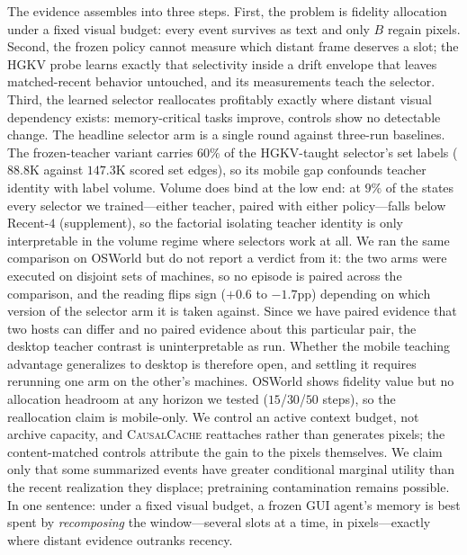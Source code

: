 \documentclass[letterpaper]{article} %
\newcommand{\method}{\textsc{CausalCache}}
\newcommand{\hgkv}{\textsc{HGKV}}
\begin{document}
The evidence assembles into three steps. First, the problem is fidelity
allocation under a fixed visual budget: every event survives as text and
only $B$ regain pixels. Second, the frozen policy cannot measure which
distant frame deserves a slot; the \hgkv{} probe learns exactly that
selectivity inside a drift envelope that leaves matched-recent behavior
untouched, and its measurements teach the selector. Third, the learned
selector reallocates profitably exactly where distant visual dependency
exists: memory-critical tasks improve, controls show no detectable
change.
The headline selector arm is a single round against three-run baselines.
The frozen-teacher variant carries $60\%$ of the \hgkv{}-taught
selector's set labels ($88.8$K against $147.3$K scored set edges), so
its mobile gap confounds teacher identity with label volume. Volume
does bind at the low end: at
$9\%$ of the states every selector we trained---either teacher, paired
with either policy---falls below Recent-$4$ (supplement), so the
factorial isolating teacher identity is only interpretable in the
volume regime where selectors work at all. We ran the same comparison on
OSWorld but do not report a verdict from it: the two arms were executed
on disjoint sets of machines, so no episode is paired across the
comparison, and the reading flips sign ($+0.6$ to $-1.7$pp) depending on
which version of the selector arm it is taken against. Since we have
paired evidence that two hosts can differ and no paired evidence about
this particular pair, the desktop teacher contrast is uninterpretable as
run. Whether the mobile teaching advantage generalizes to desktop is
therefore open, and settling it requires rerunning one arm on the
other's machines. OSWorld shows fidelity value but no
allocation headroom at any horizon we tested ($15$/$30$/$50$ steps), so
the reallocation claim is mobile-only. We control an active context budget, not archive
capacity, and \method{} reattaches rather than generates pixels; the
content-matched controls attribute the gain to the pixels themselves.
We claim only that some summarized events have greater conditional
marginal utility than the recent realization they displace; pretraining
contamination remains possible. In one sentence: under a fixed visual
budget, a frozen GUI agent's memory is best spent by \emph{recomposing}
the window---several slots at a time, in pixels---exactly where distant
evidence outranks recency.


\end{document}
